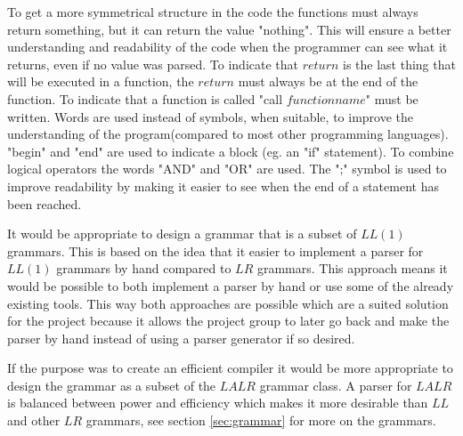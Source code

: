 To get a more symmetrical structure in the code the functions must always return something, but it can return the value "nothing". This will ensure a better understanding and readability of the code when the programmer can see what it returns, even if no value was parsed. To indicate that $return$ is the last thing that will be executed in a function, the $return$ must always be at the end of the function. To indicate that a function is called "call $functionname$" must be written.
Words are used instead of symbols, when suitable, to improve the understanding of the program(compared to most other programming languages).
"begin" and "end" are used to indicate a block (eg. an "if" statement). To combine logical operators the words "AND" and "OR" are used. The ";" symbol is used to improve readability by making it easier to see when the end of a statement has been reached.

It would be appropriate to design a grammar that is a subset of $LL(1)$ grammars. This is based on the idea that it easier to implement a parser for $LL(1)$ grammars by hand compared to $LR$ grammars. This approach means it would be possible to both implement a parser by hand or use some of the already existing tools. This way both approaches are possible which are a suited solution for the project because it allows the project group to later go back and make the parser by hand instead of using a parser generator if so desired.

If the purpose was to create an efficient compiler it would be more appropriate to design the grammar as a subset of the $LALR$ grammar class. A parser for $LALR$ is balanced between power and efficiency which makes it more desirable than $LL$ and other $LR$ grammars, see section \ref{sec:grammar} for more on the grammars. %
